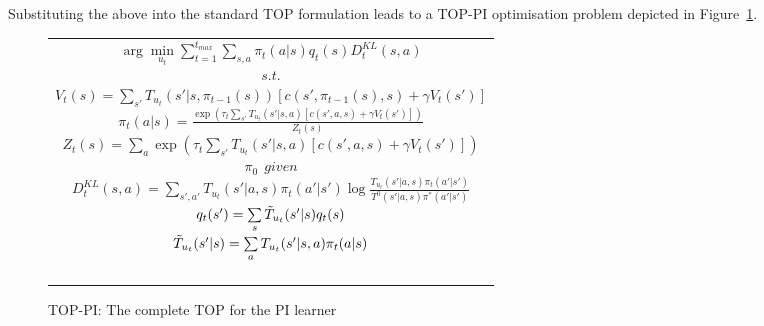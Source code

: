 Substituting the above into the standard
TOP formulation leads to a TOP-PI optimisation problem depicted in
Figure~\ref{t_opt_PI}.
\begin{figure}[th]
\begin{tabular}{|c|} \hline \parbox{3.2 in} {\center 
$\arg\min\limits_{u_t}\sum\limits_{t=1}^{t_{max}}\sum\limits_{s,a}\pi_t(a|s)q_t(s)D^{KL}_t(s,a)$\\
$s.t.$\\
$V_t(s)=\sum\limits_{s'}T_{u_t}(s'|s,\pi_{t-1}(s))\left[
c(s',\pi_{t-1}(s),s)+\gamma V_t(s')
\right]$\\
$\pi_t(a|s)=\frac{\exp\left(\tau_t\sum\limits_{s'}T_{u_t}(s'|s,a)\left[
c(s',a,s)+\gamma V_t(s')
\right]\right)}{Z_t(s)}$\\
$Z_t(s)=\sum\limits_a\exp\left(\tau_t\sum\limits_{s'}T_{u_t}(s'|s,a)\left[
c(s',a,s)+\gamma V_t(s')
\right]\right)$\\
$\pi_0\ \ \displaystyle{given}$\\
$D^{KL}_t(s,a)=\sum\limits_{s',a'}T_{u_t}(s'|a,s)\pi_t(a'|s')\log\frac{T_{u_t}(s'|a,s)\pi_t(a'|s')}{T^0(s'|a,s)\pi^*(a'|s')}$\\
$q_t(s')=\sum\limits_s\Tilde{T}_{u_t}(s'|s)q_t(s)$\\
$\Tilde{T}_{u_t}(s'|s)=\sum\limits_aT_{u_t}(s'|s,a)\pi_t(a|s)$\\\ \\
}\\ \hline \end{tabular}
\caption{\label{t_opt_PI}TOP-PI: The complete %
TOP for the
  PI learner}
\end{figure}
